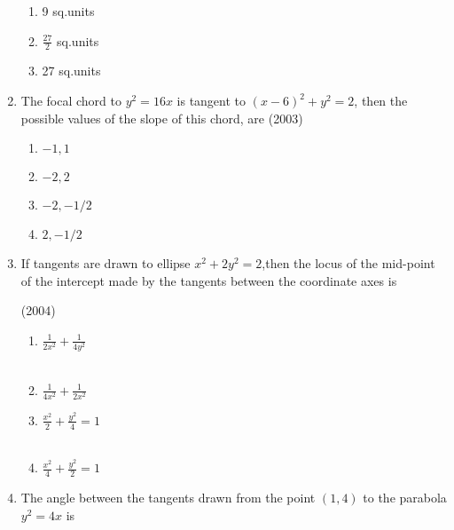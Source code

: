 \begin{enumerate}
\begin{multicols}{2}
\begin{enumerate}
    \item 9 sq.units
    \item $\frac{27}{2}$ sq.units
    \item 27 sq.units
 \end{enumerate}
\end{multicols}
\item The focal chord to $y^{2}=16x$ is tangent to $(x-6)^{2}+y^{2}=2$, then the possible values of the slope of this chord, are \hfill{(2003)}
\begin{multicols}{4}
\begin{enumerate}
    \item ${-1,1}$
    \item ${-2,2}$
    \item ${-2,-1/2}$
    \item ${2,-1/2}$
\end{enumerate}
\end{multicols}
\item If tangents are drawn to ellipse $x^{2}+2y^{2}=2$,then the locus of the mid-point of the intercept made by the tangents between the coordinate axes is 

\hfill{(2004)}
\begin{multicols}{2}
\begin{multicols}{2}
\begin{enumerate}
    \item $\frac{1}{2x^{2}}+\frac{1}{4y^{2}}$ \\\\
    \item $\frac{1}{4x^{2}}+\frac{1}{2x^{2}}$ 
    \item $\frac{x^{2}}{2}+\frac{y^{2}}{4}=1$ \\\\
    \item $\frac{x^{2}}{4}+\frac{y^{2}}{2}=1$ 
\end{enumerate}
\end{multicols}
\end{multicols}
\item The angle between the tangents drawn from the point ${(1,4)}$ to the parabola $y^{2}=4x$ is 


\end{enumerate}
